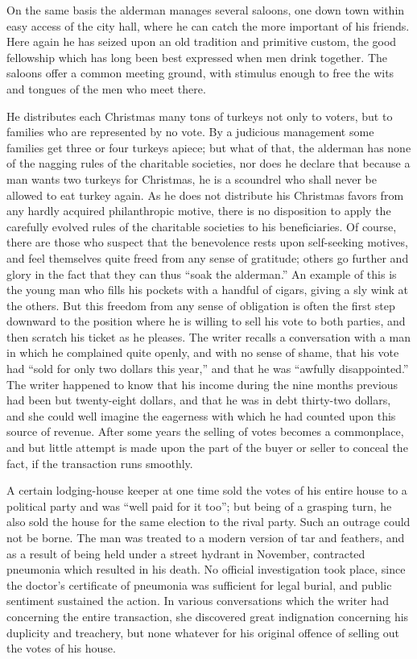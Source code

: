 \documentclass[]{article}
\begin{document}
\begin{sectionbody}
\addamsparagraph On the same basis the alderman manages several saloons, one down town
within easy access of the city hall, where he can catch the more
important of his friends. Here again he has seized upon an old tradition
and primitive custom, the good fellowship which has long been best
expressed when men drink together. The saloons offer a common meeting
ground, with stimulus enough to free the wits and tongues of the men who
meet there.

\addamsparagraph He distributes each Christmas many tons of turkeys not only to voters,
but to families who are represented by no vote. By a judicious
management some families get three or four turkeys apiece; but what of
that, the alderman has none of the nagging rules of the charitable
societies, nor does he declare that because a man wants two turkeys for
Christmas, he is a scoundrel who shall never be allowed to eat turkey
again. As he does not distribute his Christmas favors from any hardly
acquired philanthropic motive, there is no disposition to apply the
carefully evolved rules of the charitable societies to his
beneficiaries. Of course, there are those who suspect that the
benevolence rests upon self-seeking motives, and feel themselves quite
freed from any sense of gratitude; others go further and glory in the
fact that they can thus ``soak the alderman.'' An example of this is the
young man who fills his pockets with a handful of cigars, giving a sly
wink at the others. But this freedom from any sense of obligation is
often the first step downward to the position where he is willing to
sell his vote to both parties, and then scratch his ticket as he
pleases. The writer recalls a conversation with a man in which he
complained quite openly, and with no sense of shame, that his vote had
``sold for only two dollars this year,'' and that he was ``awfully
disappointed.'' The writer happened to know that his income during the
nine months previous had been but twenty-eight dollars, and that he was
in debt thirty-two dollars, and she could well imagine the eagerness
with which he had counted upon this source of revenue. After some years
the selling of votes becomes a commonplace, and but little attempt is
made upon the part of the buyer or seller to conceal the fact, if the
transaction runs smoothly.

\addamsparagraph A certain lodging-house keeper at one time sold the votes of his entire
house to a political party and was ``well paid for it too''; but being of
a grasping turn, he also sold the house for the same election to the
rival party. Such an outrage could not be borne. The man was treated to
a modern version of tar and feathers, and as a result of being held
under a street hydrant in November, contracted pneumonia which resulted
in his death. No official investigation took place, since the doctor's
certificate of pneumonia was sufficient for legal burial, and public
sentiment sustained the action. In various conversations which the
writer had concerning the entire transaction, she discovered great
indignation concerning his duplicity and treachery, but none whatever
for his original offence of selling out the votes of his house.


\end{sectionbody}
\end{document}
